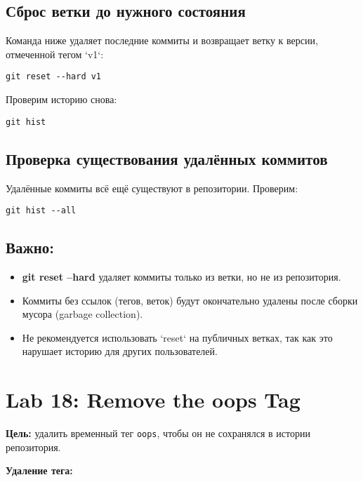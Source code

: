 \documentclass[a4paper,12pt]{report}
\begin{document}
\subsection*{Сброс ветки до нужного состояния}
Команда ниже удаляет последние коммиты и возвращает ветку к версии, отмеченной тегом `v1`:
\begin{verbatim}
git reset --hard v1
\end{verbatim}

Проверим историю снова:
\begin{verbatim}
git hist
\end{verbatim}


\subsection*{Проверка существования удалённых коммитов}
Удалённые коммиты всё ещё существуют в репозитории. Проверим:
\begin{verbatim}
git hist --all
\end{verbatim}


\subsection*{Важно:}
\begin{itemize}
  \item \textbf{git reset --hard} удаляет коммиты только из ветки, но не из репозитория.
  \item Коммиты без ссылок (тегов, веток) будут окончательно удалены после сборки мусора (garbage collection).
  \item Не рекомендуется использовать `reset` на публичных ветках, так как это нарушает историю для других пользователей.
\end{itemize}

\section{Lab 18: Remove the oops Tag}
\textbf{Цель:} удалить временный тег \texttt{oops}, чтобы он не сохранялся в истории репозитория.

\textbf{Удаление тега:}
\end{document}
